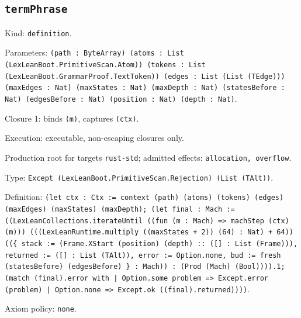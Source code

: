 \documentclass[11pt]{article}
\begin{document}
\subsection*{\texttt{termPhrase}}
\noindent Kind: \texttt{definition}.\par
\noindent Parameters: \texttt{(path : ByteArray) (atoms : List (LexLeanBoot.PrimitiveScan.Atom)) (tokens : List (LexLeanBoot.GrammarProof.TextToken)) (edges : List (List (TEdge))) (maxEdges : Nat) (maxStates : Nat) (maxDepth : Nat) (statesBefore : Nat) (edgesBefore : Nat) (position : Nat) (depth : Nat)}.\par
\noindent Closure 1: binds \texttt{(m)}, captures \texttt{(ctx)}.\par
\noindent Execution: executable, non-escaping closures only.\par
\noindent Production root for targets \texttt{rust-std}; admitted effects: \texttt{allocation, overflow}.\par
\noindent Type: \texttt{Except (LexLeanBoot.PrimitiveScan.Rejection) (List (TAlt))}.\par
\noindent Definition: \texttt{(let ctx : Ctx := context (path) (atoms) (tokens) (edges) (maxEdges) (maxStates) (maxDepth); (let final : Mach := ((LexLeanCollections.iterateUntil ((fun (m : Mach) => machStep (ctx) (m))) (((LexLeanRuntime.multiply ((maxStates + 2)) (64) : Nat) + 64)) ((\{ stack := (Frame.XStart (position) (depth) :: ([] : List (Frame))), returned := ([] : List (TAlt)), error := Option.none, bud := fresh (statesBefore) (edgesBefore) \} : Mach)) : (Prod (Mach) (Bool)))).1; (match (final).error with | Option.some problem => Except.error (problem) | Option.none => Except.ok ((final).returned))))}.\par
\noindent Axiom policy: \texttt{none}.\par
\end{document}
